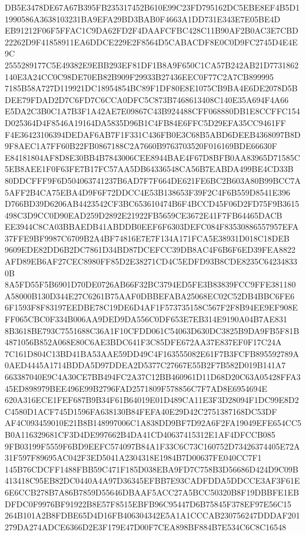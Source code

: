 \documentclass[UTF8,fontset=fandol,zihao=-4,a4paper]{ctexart}
\begin{document}
{{DB5E3478DE67A67B395FB235317452B610E99C23FD795162DC5EBE8EF4B5D11990586A3638103231BA9EFA29BD3BAB0F4663A1DD731E343E7E05BE4D
EB91212F06F5FFAC1C9DA62FD2F4DAAFCFBC428C11B90AF2B0AC3E7CBD22262D9F41858911EA6DDCE229E2F8564D5CABACDF8E0C0D9FC2745D4E4E9C
2555289177C5E49382E9EBB293EF81DF1B8A9F650C1CA57B242AB21D7731862140E3A24CC0C98DE70EB82B909F29933B27436EEC0F77C2A7CB899995
7185B58A727D119921DC18954854BC89F1DF80E8E1075CB9BA4E6DE2078D5BDEE79FDAD2D7C6FD7C6CCA0DFC5C873B7468613408C140E35A694F4A66
E5DA2C3B0C1A7B3F1A42AE7E09867C43B924488CFF068880DB1E8CCFFC154D025364D4F8546A19164DA5835D96B1C4FB84E6FFC5D29EFA35CC9461FF
F4E36423106394DEDAF6AB7F1F331C436FB0E3C68B5ABD6DEEB4368097B8D9F8AEC1A7FF60B22FB0867188C2A7660B9763703520F016169BDE66630F
E84181804AF8D8E30BB4B7843006CEE8944BAE4F67D8BFB0AA83965D71585C5EB8AEE1F0F63FE7B17FC57AA5DB64336548CA56B7EABDA499BE4CD33B
80DDCFFF9F6D504063741237B6AD7F7F664DE621FE6BC2B603A80B99BCC7A5AFF2B4CA75EBA4D9F6F72DDCC4E53B138653F39F2C4F6B559D8541E396
D766BD39D6206AB4423542CF3BC653610474B6F4BCCD45F06D2FD75F9B3615498C3D9CC0D90EAD259D2892E21922FB5659CE3672E41F7FB64465DACB
EE3944C8CA03BBAEDB41ABDDB0EEF6F6303DEFC084F83530886557957EFA37FFE9BF9987C6709B2A4BF74816E7E7F134A171FCA5E38931D018C18DEB
9609EDE82DD6B2DC7861D34BD87DCEFCC39DB8AC4F6B6F6ED39FEA8822AFD89EB6AF27CEC8980FF85D2E38271CD4C5EDFD93B8CDE8235C642348330B
8A5FD55F5B6901D70DE0726AB66F32BC3794ED5FE3B83839FCC9FFE381180A58000B130D344E27C6261B75AAF0DBBEFABA25068EC02C52DB4BBC6FE6
6F1593F8F83197EEDBE78C19DE6D4AF1F573735158C567F2F8B94EE9EF908EFF065CBC0F334B006AA9DED9DA556C0DF653E7EB314E9190A04B7AE831
8B3618BE793C7551688C36A1F10CFDD061C54063D630DC3825B9DA9FB5F81B4871056B852A068E80C6AE3BDC641F3C85DFE672AA37E837EF0F17C24A
7C161D804C13BD41BA53AAE59DD49C4F163555082E61F7B3FCFB895592789A0AED4445A1714BDDA5D97DDEA2D5377C27667E55B2F7B582D019B141A7
663387040E9C4A30CE7BB494FC2A37C12BB460961D11D68D20C63A05428FFA345ED898979BEE496E99B2796FAD2571809F578856C7F7AD8E6954694E
620A316ECE1FEF687B9B34F61B64019E01D489CA11E3F3D28094F1DC99E8D2C4580D1ACF745D1596FA638130B84FEFA40E29D42C2751387168DC53DF
AF4C093459010E21B8B148997006C1A838DD9BF7D92A6F2FA19049EFE654CC5B0A116329681CF3D4DE997662B4DA41CD40637415312E1AF4DFCCB085
9FB03199F5559F6BD9EEFC574097B84A1F33C6C73C160752D73426374405E72A31F597F89695AC042F3ED5041A2304318E1984B7D00637FE040CC7F1
145B76CDCFF1488FBB59C471F185D038EBA9FD7C758B3D56686D424D9C09B413418C95EB82DC0440A4A97D36345EFBB7E93CADFDDA5DDCCE3AF3F61E
6E6CCB278B7A86B7859D55646DBAAF5ACC27A5BCC50320B8F19DBBFE1EBDFDC0F9976BF91922B8E57F8515EBFB96C95447D6B75845F378EF97E56C15
264B101A2B8FDBE65D4D16FB406304342E5A1A1CCCAB230756247DDDAF201279DA274ADCE6366D2E3F179E47D00F7CEA898BF884B7E534C6C8C16548
}}
\end{document}

